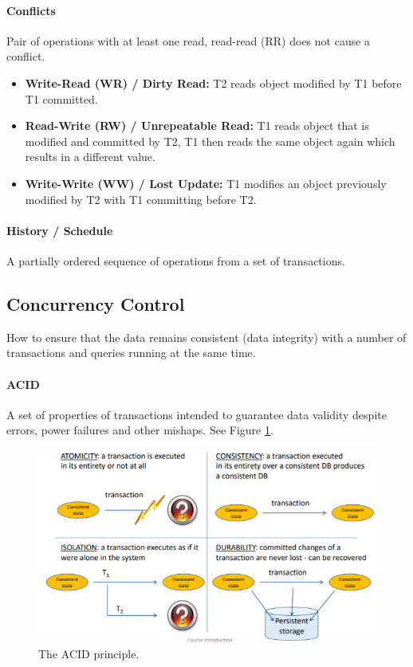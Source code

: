 \paragraph{Conflicts}
Pair of operations with at least one read, read-read (RR) does not cause a conflict.
\begin{itemize}
    \item \textbf{Write-Read (WR) / Dirty Read:} T2 reads object modified by T1 before T1 committed.
    \item \textbf{Read-Write (RW) / Unrepeatable Read:} T1 reads object that is modified and committed by T2, T1 then reads the same object again which results in a different value.
    \item \textbf{Write-Write (WW) / Lost Update:} T1 modifies an object previously modified by T2 with T1 committing before T2.
\end{itemize} 


\paragraph{History / Schedule}
A partially ordered sequence of operations from a set of transactions. 



\subsection{Concurrency Control}

How to ensure that the data remains consistent (data integrity) with a number of transactions and queries running at the same time.

\paragraph{ACID}
A set of properties of transactions intended to guarantee data validity despite errors, power failures and other mishaps. See Figure \ref{fig:acid}.

\begin{figure}[h]
	\centering
	\includegraphics[scale=0.8]{images/00-acid.PNG}
	\caption{The ACID principle.}
	\label{fig:acid}
\end{figure}


